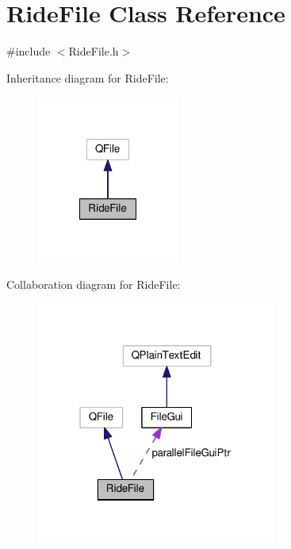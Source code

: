 \hypertarget{class_ride_file}{\section{Ride\-File Class Reference}
\label{class_ride_file}
}


{\ttfamily \#include $<$Ride\-File.\-h$>$}



Inheritance diagram for Ride\-File\-:\nopagebreak
\begin{figure}[H]
\begin{center}
\leavevmode
\includegraphics[width=132pt]{class_ride_file__inherit__graph}
\end{center}
\end{figure}


Collaboration diagram for Ride\-File\-:\nopagebreak
\begin{figure}[H]
\begin{center}
\leavevmode
\includegraphics[width=223pt]{class_ride_file__coll__graph}
\end{center}
\end{figure}
